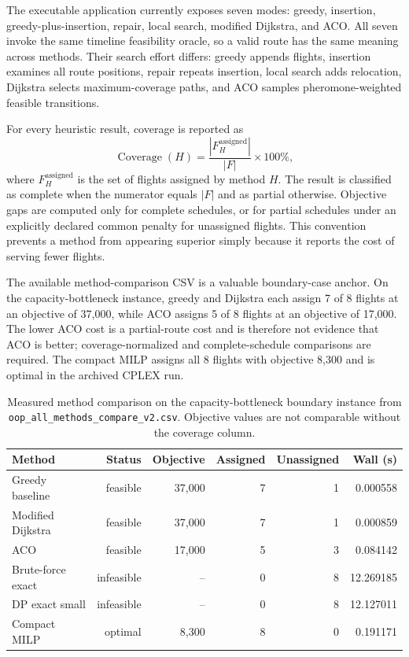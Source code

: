 The executable application currently exposes seven modes: greedy, insertion,
greedy-plus-insertion, repair, local search, modified Dijkstra, and ACO. All
seven invoke the same timeline feasibility oracle, so a valid route has the same
meaning across methods. Their search effort differs: greedy appends flights,
insertion examines all route positions, repair repeats insertion, local search
adds relocation, Dijkstra selects maximum-coverage paths, and ACO samples
pheromone-weighted feasible transitions.

For every heuristic result, coverage is reported as
\begin{equation}
  \operatorname{Coverage}(H)=
  \frac{|F_H^{\mathrm{assigned}}|}{|F|}\times 100\%,
\end{equation}
where $F_H^{\mathrm{assigned}}$ is the set of flights assigned by method $H$.
The result is classified as complete when the numerator equals $|F|$ and as
partial otherwise. Objective gaps are computed only for complete schedules, or
for partial schedules under an explicitly declared common penalty for
unassigned flights. This convention prevents a method from appearing superior
simply because it reports the cost of serving fewer flights.

The available method-comparison CSV is a valuable boundary-case anchor. On the
capacity-bottleneck instance, greedy and Dijkstra each assign 7 of 8 flights at
an objective of 37,000, while ACO assigns 5 of 8 flights at an objective of
17,000. The lower ACO cost is a partial-route cost and is therefore not evidence
that ACO is better; coverage-normalized and complete-schedule comparisons are
required. The compact MILP assigns all 8 flights with objective 8,300 and is
optimal in the archived CPLEX run.

\begin{table}[t]
\centering\small
\caption{Measured method comparison on the capacity-bottleneck boundary
instance from \texttt{oop\_all\_methods\_compare\_v2.csv}. Objective values
are not comparable without the coverage column.}
\label{tab:heuristic_boundary}
\begin{tabular}{lrrrrr}
\toprule
Method & Status & Objective & Assigned & Unassigned & Wall (s) \\
\midrule
Greedy baseline & feasible & 37,000 & 7 & 1 & 0.000558 \\
Modified Dijkstra & feasible & 37,000 & 7 & 1 & 0.000859 \\
ACO & feasible & 17,000 & 5 & 3 & 0.084142 \\
Brute-force exact & infeasible & -- & 0 & 8 & 12.269185 \\
DP exact small & infeasible & -- & 0 & 8 & 12.127011 \\
Compact MILP & optimal & 8,300 & 8 & 0 & 0.191171 \\
\bottomrule
\end{tabular}
\end{table}

